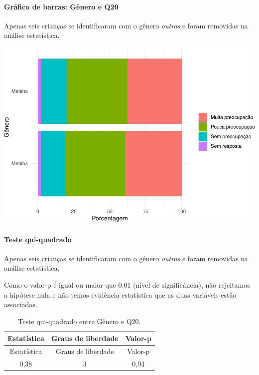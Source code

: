\documentclass[]{article}
\let\oldparagraph\paragraph
\renewcommand{\paragraph}[1]{\oldparagraph{#1}\mbox{}}
\begin{document}
\hypertarget{gruxe1fico-de-barras-guxeanero-e-q20}{%
\paragraph{Gráfico de barras: Gênero e Q20}\label{gruxe1fico-de-barras-guxeanero-e-q20}}

Apenas seis crianças se identificaram com o gênero \emph{outros} e foram removidas na análise estatística.

\begin{center}\includegraphics[width=0.75\linewidth]{relatorio_covid19_files/figure-latex/unnamed-chunk-377-1} \end{center}

\hypertarget{teste-qui-quadrado-33}{%
\paragraph{Teste qui-quadrado}\label{teste-qui-quadrado-33}}

Apenas seis crianças se identificaram com o gênero \emph{outros} e foram removidas na análise estatística.

Como o valor-p é igual ou maior que 0.01 (nível de significância), não rejeitamos a hipótese nula e não temos evidência estatística que as duas variáveis estão associadas.

\begin{longtable}[]{@{}ccc@{}}
\caption{\label{tab:unnamed-chunk-379}Teste qui-quadrado entre Gênero e Q20.}\tabularnewline
\toprule
Estatística & Graus de liberdade & Valor-p\tabularnewline
\midrule
\endfirsthead
\toprule
Estatística & Graus de liberdade & Valor-p\tabularnewline
\midrule
\endhead
0,38 & 3 & 0,94\tabularnewline
\bottomrule
\end{longtable}

\cleardoublepage
\end{document}
